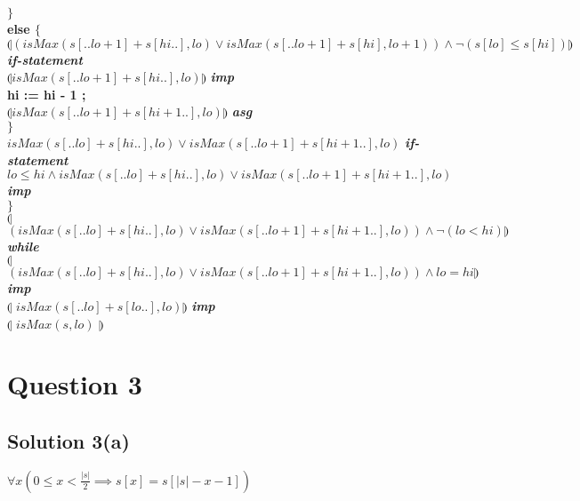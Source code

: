 \documentclass[12pt]{article}
\newcommand\abs[1]{\left|#1\right|}
\begin{document}
\hspace*{10mm}\textbf{$\}$} \\
\hspace*{10mm}\textbf{else $\{$} \\
\hspace*{20mm}$\limg (isMax(s[..lo+1]+s[hi..], lo) \lor isMax(s[..lo+1]+s[hi], lo+1)) \land \neg(s[lo] \leq s[hi])\rimg$	\\ \hspace*{20mm}\textit{\textbf{if-statement}}\\
\hspace*{20mm}$\limg isMax(s[..lo+1]+s[hi..], lo) \rimg$ \textit{\textbf{imp}}\\
\hspace*{20mm}\textbf{hi := hi - 1 ;} \\
\hspace*{20mm}$\limg isMax(s[..lo+1]+s[hi+1..], lo) \rimg$ \textit{\textbf{asg}}\\
\hspace*{10mm}\textbf{$\}$} \\
\hspace*{10mm}$isMax(s[..lo]+s[hi..], lo) \lor isMax(s[..lo+1]+s[hi+1..], lo)$ \textit{\textbf{if-statement}}\\
\hspace*{10mm}$lo \leq hi \land isMax(s[..lo]+s[hi..], lo) \lor isMax(s[..lo+1]+s[hi+1..], lo)$ \textit{\textbf{imp}}\\
\textbf{$\}$} \\
$\limg$ $(isMax(s[..lo]+s[hi..], lo) \lor isMax(s[..lo+1]+s[hi+1..], lo))\land \neg(lo < hi) \rimg$ \textit{\textbf{while}}\\
$\limg$ $(isMax(s[..lo]+s[hi..], lo) \lor isMax(s[..lo+1]+s[hi+1..], lo))\land lo = hi \rimg$ \textit{\textbf{imp}}\\
$\limg$ $isMax(s[..lo]+s[lo..], lo) \rimg$ \textit{\textbf{imp}}\\
$\limg$ $isMax(s, lo)$ $\rimg$
\newpage
\section*{Question 3}
\subsection*{Solution 3(a)}
$\forall x (0 \leq x < \frac{\abs{s}}{2} \implies s[x]=s[\abs{s}-x-1])$
\end{document}
